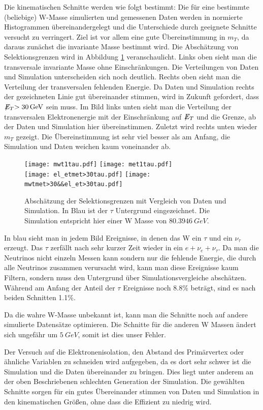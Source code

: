 \documentclass[a4paper,12pt]{article}
\newcommand{\met}{\ensuremath{\not\mathrel{E}}_T}
\begin{document}
Die kinematischen Schnitte werden wie folgt bestimmt:
Die für eine bestimmte (beliebige) W-Masse simulierten und gemessenen Daten werden in normierte Histogrammen übereinandergelegt
und die Unterschiede durch geeignete Schnitte versucht zu verringert. Ziel ist vor allem eine gute
Übereinstimmung in $m_T$, da daraus zunächst die invariante Masse bestimmt wird. Die Abschätzung von Selektionsgrenzen
wird in Abbildung \ref{fig:abschaetzung} veranschaulicht. Links oben sieht man die transversale
invariante Masse ohne Einschränkungen. Die Verteilungen von Daten und Simulation unterscheiden sich
noch deutlich. Rechts oben sieht man die Verteilung der transversalen
fehlenden Energie. Da Daten und Simulation rechts der gezeichneten Linie gut übereinander stimmen,
wird in Zukunft gefordert, dass $\met > \SI{30}{GeV}$ sein muss. Im Bild links unten sieht man die
Verteilung der transversalen Elektronenergie mit der Einschränkung auf $\met$ und die Grenze, ab der Daten und Simulation hier
übereinstimmen. Zuletzt wird rechts unten wieder $m_T$ gezeigt. Die Übereinstimmung ist sehr viel
besser als am Anfang, die Simulation und Daten weichen kaum voneinander ab.

\begin{figure}[h]
	\centering
	\texttt{[image: mwt1tau.pdf]}
	\texttt{[image: met1tau.pdf]}\\
	\texttt{[image: el\_etmet>30tau.pdf]}
	\texttt{[image: mwtmet>30\&\&el\_et>30tau.pdf]}
	\caption{Abschätzung der Selektionsgrenzen mit Vergleich von Daten und Simulation. In Blau ist
	der $τ$ Untergrund eingezeichnet. Die Simulation entspricht hier einer W Masse von
	$\SI{80.3946}{GeV}$.}
	\label{fig:abschaetzung}
\end{figure}

In blau sieht man in jedem Bild Ereignisse, in denen das W ein $τ$ und ein $ν_τ$ erzeugt. Das $τ$
zerfällt nach sehr kurzer Zeit wieder in ein $e + ν_e + ν_τ$. Da man die Neutrinos nicht einzeln
Messen kann sondern nur die fehlende Energie, die durch alle Neutrinos zusammen verursacht wird,
kann man diese Ereignisse kaum Filtern, sondern muss den Untergrund über Simulationsvergleiche
abschätzen. Während am Anfang der Anteil der $τ$ Ereignisse noch 8.8\% beträgt, sind es nach beiden
Schnitten 1.1\%.

Da die wahre W-Masse unbekannt ist, kann man die Schnitte noch auf andere simulierte Datensätze
optimieren. Die Schnitte für die anderen W Massen ändert sich ungefähr um $\SI{5}{GeV}$, somit ist
dies unser Fehler.

Der Versuch auf die Elektronenisolation, den Abstand des Primärvertex oder ähnliche Variablen zu
schneiden wird aufgegeben, da es dort sehr schwer ist die Simulation und die Daten übereinander zu
bringen. Dies liegt unter anderem an der oben Beschriebenen schlechten Generation der Simulation.
Die gewählten Schnitte sorgen für ein gutes Übereinander stimmen von Daten und Simulation in den
kinematischen Größen, ohne dass die Effizient zu niedrig wird.
\end{document}
